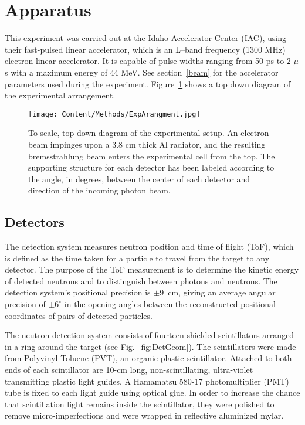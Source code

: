 
\section{Apparatus}
This experiment was carried out at the Idaho Accelerator Center (IAC), using their fast-pulsed linear accelerator, which is an L--band frequency (1300 MHz) electron linear accelerator.
It is capable of pulse widths ranging from 50 ps to 2 $\mu$s with a maximum energy of 44 MeV.
See section~\ref{beam} for the accelerator parameters used during the experiment.
Figure~\ref{fig:Facility} shows a top down diagram of the experimental arrangement.

\begin{figure}[h]
\centering
\texttt{[image: Content/Methods/ExpArangment.jpg]}
\caption{To-scale, top down diagram of the experimental setup.
An electron beam impinges upon a 3.8 cm thick Al radiator, and the resulting bremsstrahlung beam enters the experimental cell from the top.
The supporting structure for each detector has been labeled according to the angle, in degrees, between the center of each detector and direction of the incoming photon beam.
}
\label{fig:Facility}
\end{figure}
\subsection{Detectors}
\label{subsection:detectors}
The detection system measures neutron position and time of flight (ToF), which is defined as the time taken for a particle to travel from the target to any detector.
The purpose of the ToF measurement is to determine the kinetic energy of detected neutrons and to distinguish between photons and neutrons.
The detection system's positional precision is $\pm$9~cm, giving an average angular precision of $\pm6^{\circ}$ in the opening angles between the reconstructed positional coordinates of pairs of detected particles.

The neutron detection system consists of fourteen shielded scintillators arranged in a ring around the target (see Fig.~\ref{fig:DetGeom}).
The scintillators were made from Polyvinyl Toluene (PVT), an organic plastic scintillator.
Attached to both ends of each scintillator are 10-cm long, non-scintillating, ultra-violet transmitting plastic light guides.
A Hamamatsu 580-17 photomultiplier (PMT) tube is fixed to each light guide using optical glue.
In order to increase the chance that scintillation light remains inside the scintillator, they were polished to remove micro-imperfections and were wrapped in reflective aluminized mylar.

